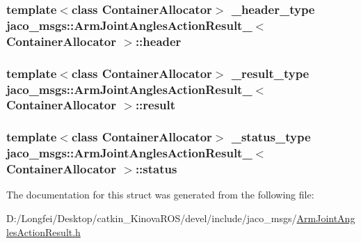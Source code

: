\subsubsection[{\texorpdfstring{header}{header}}]{\setlength{\rightskip}{0pt plus 5cm}template$<$class Container\+Allocator$>$ {\bf \+\_\+header\+\_\+type} {\bf jaco\+\_\+msgs\+::\+Arm\+Joint\+Angles\+Action\+Result\+\_\+}$<$ Container\+Allocator $>$\+::header}\hypertarget{structjaco__msgs_1_1ArmJointAnglesActionResult___a079944c74fedafa50405d3b8c9631a84}{}\label{structjaco__msgs_1_1ArmJointAnglesActionResult___a079944c74fedafa50405d3b8c9631a84}
\subsubsection[{\texorpdfstring{result}{result}}]{\setlength{\rightskip}{0pt plus 5cm}template$<$class Container\+Allocator$>$ {\bf \+\_\+result\+\_\+type} {\bf jaco\+\_\+msgs\+::\+Arm\+Joint\+Angles\+Action\+Result\+\_\+}$<$ Container\+Allocator $>$\+::result}\hypertarget{structjaco__msgs_1_1ArmJointAnglesActionResult___a7d2ea6532c4fe6e71f98b67a55df9d86}{}\label{structjaco__msgs_1_1ArmJointAnglesActionResult___a7d2ea6532c4fe6e71f98b67a55df9d86}
\subsubsection[{\texorpdfstring{status}{status}}]{\setlength{\rightskip}{0pt plus 5cm}template$<$class Container\+Allocator$>$ {\bf \+\_\+status\+\_\+type} {\bf jaco\+\_\+msgs\+::\+Arm\+Joint\+Angles\+Action\+Result\+\_\+}$<$ Container\+Allocator $>$\+::status}\hypertarget{structjaco__msgs_1_1ArmJointAnglesActionResult___abcee28ae9e735f3212832991bce38b20}{}\label{structjaco__msgs_1_1ArmJointAnglesActionResult___abcee28ae9e735f3212832991bce38b20}


The documentation for this struct was generated from the following file\+:\begin{DoxyCompactItemize}
\item 
D\+:/\+Longfei/\+Desktop/catkin\+\_\+\+Kinova\+R\+O\+S/devel/include/jaco\+\_\+msgs/\hyperlink{ArmJointAnglesActionResult_8h}{Arm\+Joint\+Angles\+Action\+Result.\+h}\end{DoxyCompactItemize}
